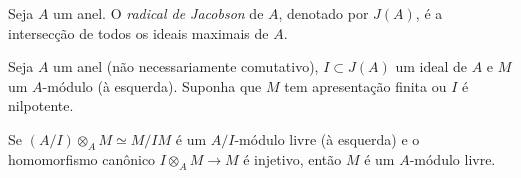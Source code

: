 \begin{defn}
Seja $A$ um anel. O \emph{radical de Jacobson} de $A$, denotado por $J(A)$, é a intersecção de todos os ideais maximais de $A$.
\end{defn}

\begin{teo} \label{teo:bourbaki} \cite[II, , p.83, Proposition 5]{bourbaki}
Seja $A$ um anel (não necessariamente comutativo), $I \subset J(A)$ um ideal de $A$ e $M$ um $A$-módulo (à esquerda). Suponha que $M$ tem apresentação finita ou $I$ é nilpotente. \par
Se $(A/I)\otimes_A M \simeq M/IM$ é um $A/I$-módulo livre (à esquerda) e o homomorfismo canônico $I\otimes_A M \rightarrow M$ é injetivo, então $M$ é um $A$-módulo livre.
\end{teo}

